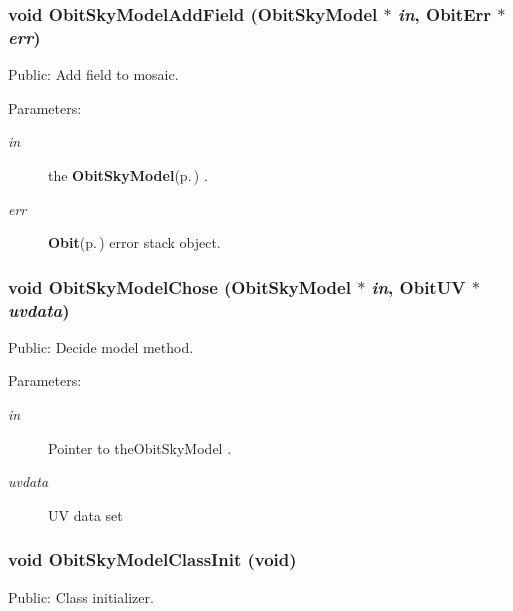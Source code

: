 \subsubsection{\setlength{\rightskip}{0pt plus 5cm}void Obit\-Sky\-Model\-Add\-Field ({\bf Obit\-Sky\-Model} $\ast$ {\em in}, {\bf Obit\-Err} $\ast$ {\em err})}\label{ObitSkyModel_8c_a41}


Public: Add field to mosaic. 

\begin{Desc}
\item[Parameters:]
\begin{description}
\item[{\em in}]the {\bf Obit\-Sky\-Model}{\rm (p.\,\pageref{structObitSkyModel})} . \item[{\em err}]{\bf Obit}{\rm (p.\,\pageref{structObit})} error stack object. \end{description}
\end{Desc}
\subsubsection{\setlength{\rightskip}{0pt plus 5cm}void Obit\-Sky\-Model\-Chose ({\bf Obit\-Sky\-Model} $\ast$ {\em in}, {\bf Obit\-UV} $\ast$ {\em uvdata})}\label{ObitSkyModel_8c_a33}


Public: Decide model method. 

\begin{Desc}
\item[Parameters:]
\begin{description}
\item[{\em in}]Pointer to the\-Obit\-Sky\-Model . \item[{\em uvdata}]UV data set \end{description}
\end{Desc}
\subsubsection{\setlength{\rightskip}{0pt plus 5cm}void Obit\-Sky\-Model\-Class\-Init (void)}\label{ObitSkyModel_8c_a43}


Public: Class initializer. 

